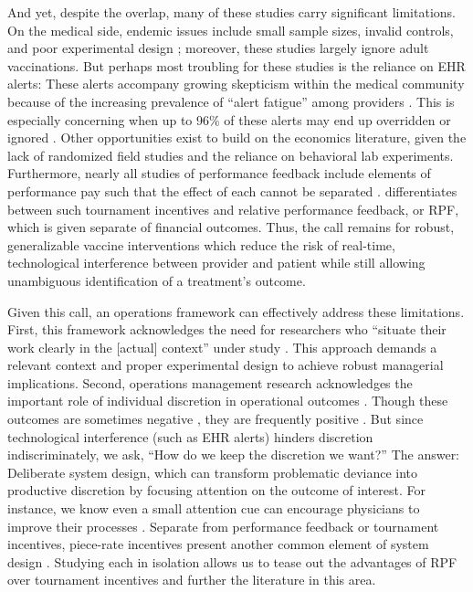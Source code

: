 \begin{onehalfspace}
 And yet, despite the overlap, many of these studies carry significant limitations. On the medical side, endemic issues include small sample sizes, invalid controls, and poor experimental design \citep[p. 1585 in][]{Smulian2016}; moreover, these studies largely ignore adult vaccinations. But perhaps most troubling for these studies is the reliance on EHR alerts: These alerts accompany growing skepticism within the medical community because of the increasing prevalence of “alert fatigue” among providers \citep{Peterson2001}. This is especially concerning when up to 96\% of these alerts may end up overridden or ignored \citep{VanDerSijs2006}. Other opportunities exist to build on the economics literature, given the lack of randomized field studies and the reliance on behavioral lab experiments. Furthermore, nearly all studies of performance feedback include elements of performance pay such that the effect of each cannot be separated \citep[e.g.,][]{Delfgaauw2014}. \cite{Schnieder2019} differentiates between such tournament incentives and relative performance feedback, or RPF, which is given separate of financial outcomes. Thus, the call remains for robust, generalizable vaccine interventions which reduce the risk of real-time, technological interference between provider and patient while still allowing unambiguous identification of a treatment’s outcome.
	
 Given this call, an operations framework can effectively address these limitations. First, this framework acknowledges the need for researchers who “situate their work clearly in the [actual] context” under study \citep[p.121]{Ibanez2019a}. This approach demands a relevant context and proper experimental design to achieve robust managerial implications. Second, operations management research acknowledges the important role of individual discretion in operational outcomes \citep[e.g.,][]{VanDonselaar2010,Campbell2011,Kim2015,Phillips2015}. Though these outcomes are sometimes negative \citep{Ibanez2017,Ibanez2019}, they are frequently positive \citep{Freeman2017,Song2018a}. But since technological interference (such as EHR alerts) hinders discretion indiscriminately, we ask, “How do we keep the discretion we want?” The answer: Deliberate system design, which can transform problematic deviance into productive discretion by focusing attention on the outcome of interest. For instance, we know even a small attention cue can encourage physicians to improve their processes \citep{Song2018a,Kim2020}. Separate from performance feedback or tournament incentives, piece-rate incentives present another common element of system design \citep{Prendergast1999,Lazear2018}. Studying each in isolation allows us to tease out the advantages of RPF over tournament incentives and further the literature in this area. 
 

\end{onehalfspace}
